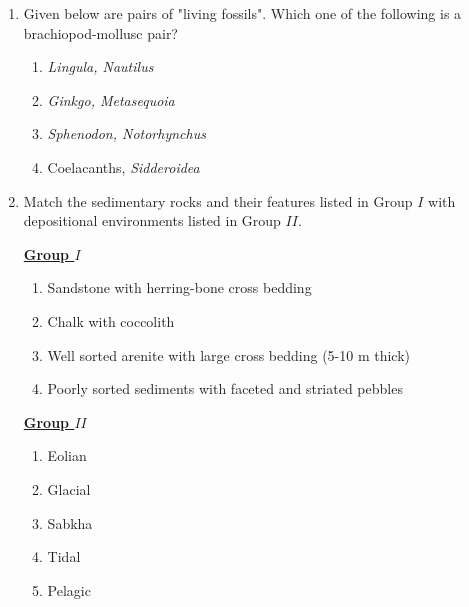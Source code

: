 \documentclass[journal,12pt,onecolumn]{IEEEtran}
\theoremstyle{remark}
\begin{document}
\begin{enumerate}
    \item Given below are pairs of "living fossils". Which one of the following is a brachiopod-mollusc pair? \hfill{}
        \begin{enumerate} 
            \item \textit{Lingula, Nautilus}
            \item \textit{Ginkgo, Metasequoia}
            \item \textit{Sphenodon, Notorhynchus}
            \item Coelacanths, \textit{Sidderoidea}
        \end{enumerate}
    
    \item Match the sedimentary rocks and their features listed in Group $I$ with depositional environments listed in Group $II$. \hfill{}
        \begin{multicols}{2}
            \underline{\textbf{Group $I$}}
            \begin{enumerate}[start=16]
                \item Sandstone with herring-bone cross bedding
                \item Chalk with coccolith
                \item Well sorted arenite with large cross bedding (5-10 m thick)
                \item Poorly sorted sediments with faceted and striated pebbles
            \end{enumerate}
            
            \columnbreak
            
            \underline{\textbf{Group $II$}}
            \begin{enumerate}
                \item Eolian
                \item Glacial
                \item Sabkha
                \item Tidal
                \item Pelagic
            \end{enumerate}
        \end{multicols}
        \begin{enumerate} 
        \end{enumerate}
    

\end{enumerate}
\end{document}
